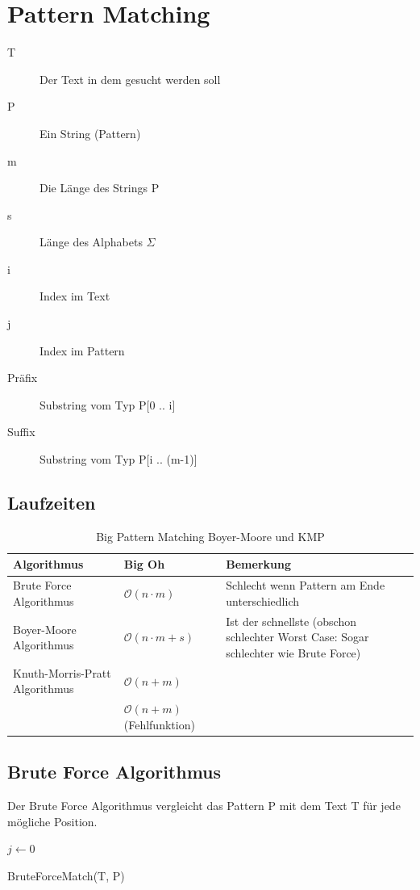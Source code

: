 \section{Pattern Matching}
\begin{description}
	\item[T] Der Text in dem gesucht werden soll
	\item[P] Ein String (Pattern)
	\item[m] Die Länge des Strings P
	\item[s] Länge des Alphabets $\Sigma$
	\item[i] Index im Text
	\item[j] Index im Pattern
	\item[Präfix] Substring vom Typ P[0 .. i]
	\item[Suffix] Substring vom Typ P[i .. (m-1)]
\end{description}

\subsection{Laufzeiten}
\begin{table}[h]
	\centering
	\begin{tabu} to \linewidth {l l X}
		\toprule
		Algorithmus & Big Oh & Bemerkung \\
		\midrule
		Brute Force Algorithmus & $\mathcal{O}(n \cdot m)$ & Schlecht wenn Pattern am Ende unterschiedlich \\
		Boyer-Moore Algorithmus & $\mathcal{O}(n \cdot m + s)$ & Ist der schnellste (obschon schlechter Worst Case: Sogar schlechter wie Brute Force) \\
		Knuth-Morris-Pratt Algorithmus & $\mathcal{O}(n+m)$ & \\
		& $\mathcal{O}(n+m)$ (Fehlfunktion)\\
		\bottomrule
	\end{tabu}
	\caption{Big Pattern Matching Boyer-Moore und KMP}
\end{table}

\subsection{Brute Force Algorithmus}
Der Brute Force Algorithmus vergleicht das Pattern P mit dem Text T für jede mögliche Position.
\begin{algorithm}[H]
	{
		$j \leftarrow 0$ \\

		 {
		}
	}
\caption{BruteForceMatch(T, P)}
\end{algorithm}


